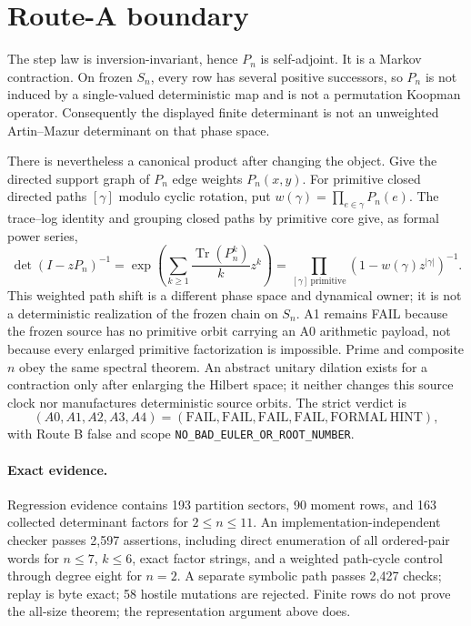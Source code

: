 \documentclass[9pt]{extarticle}
\begin{document}
\section{Route-A boundary}
The step law is inversion-invariant, hence $P_n$ is self-adjoint.  It is a
Markov contraction.  On frozen $S_n$, every row has several positive
successors, so $P_n$ is not induced by a single-valued deterministic map and
is not a permutation Koopman operator.  Consequently the displayed finite
determinant is not an unweighted Artin--Mazur determinant on that phase space.

There is nevertheless a canonical product after changing the object.  Give
the directed support graph of $P_n$ edge weights $P_n(x,y)$.  For primitive
closed directed paths $[\gamma]$ modulo cyclic rotation, put
$w(\gamma)=\prod_{e\in\gamma}P_n(e)$.  The trace--log identity and grouping
closed paths by primitive core give, as formal power series,
\[
 \det(I-zP_n)^{-1}
 =\exp\!\left(\sum_{k\ge1}\frac{\operatorname{Tr}(P_n^k)}kz^k\right)
 =\prod_{[\gamma]\ \mathrm{primitive}}
  (1-w(\gamma)z^{|\gamma|})^{-1}.
\]
This weighted path shift is a different phase space and dynamical owner; it
is not a deterministic realization of the frozen chain on $S_n$.  A1 remains
FAIL because the frozen source has no primitive orbit carrying an A0
arithmetic payload, not because every enlarged primitive factorization is
impossible.  Prime and composite $n$ obey the same spectral theorem.
An abstract unitary dilation exists for a contraction only after enlarging
the Hilbert space; it neither changes this source clock nor manufactures
deterministic source orbits.
The strict verdict is
\[
 (A0,A1,A2,A3,A4)=(\mathrm{FAIL},\mathrm{FAIL},\mathrm{FAIL},
 \mathrm{FAIL},\mathrm{FORMAL\ HINT}),
\]
with Route B false and scope
\texttt{NO\_BAD\_EULER\_OR\_ROOT\_NUMBER}.

\paragraph{Exact evidence.}
Regression evidence contains 193 partition sectors, 90 moment rows, and 163
collected determinant factors for $2\le n\le11$.  An implementation-independent
checker passes 2{,}597 assertions, including direct enumeration of all
ordered-pair words for $n\le7$, $k\le6$, exact factor strings, and a weighted
path-cycle control through degree eight for $n=2$.  A separate symbolic path
passes 2{,}427 checks; replay is byte exact; 58 hostile mutations are rejected.
Finite rows do not prove the all-size theorem; the representation argument
above does.
\end{document}
